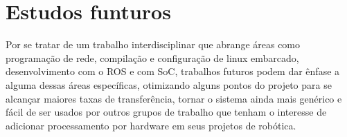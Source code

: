 \chapter{Estudos funturos}\label{cap:trabfut}

Por se tratar de um trabalho interdisciplinar que abrange áreas como programação de rede, compilação e configuração de linux embarcado, desenvolvimento com o ROS e com SoC, trabalhos futuros podem dar ênfase a alguma dessas áreas específicas, otimizando alguns pontos do projeto para se alcançar maiores taxas de transferência, tornar o sistema ainda mais genérico e fácil de ser usados por outros grupos de trabalho que tenham o interesse de adicionar processamento por hardware em seus projetos de robótica.